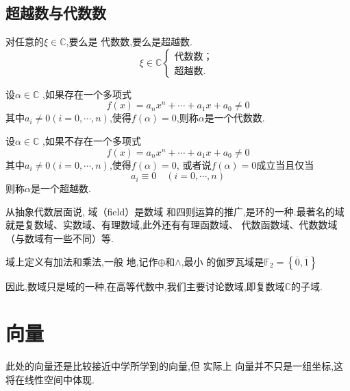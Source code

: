 \subsection{超越数与代数数}
对任意的$\xi \in \mathbb{C}$,要么是
代数数,要么是超越数.
\[
\xi \in \mathbb{C} 
\begin{cases*}
    \text{代数数；} \\
    \text{超越数.}
\end{cases*}
\]
\begin{formal}
\begin{definition}[代数数]\label{def:代数数}
    设$\alpha  \in \mathbb{C}$
    ,如果存在一个多项式
    \[
    f\left(x\right) = a_n x^n + 
    \cdots + a_1 x + a_0 \neq 0
    \]
    其中$a_i \neq 0\left(i = 0,\cdots
    ,n\right)$,使得$f\left(\alpha 
    \right) = 0$,则称$
    \alpha $是一个代数数.
\end{definition}
\end{formal}
\begin{formal}
\begin{definition}[超越数]\label{def:超越数}
    设$\alpha  \in \mathbb{C}$
    ,如果不存在一个多项式
    \[
    f\left(x\right) = a_n x^n + 
    \cdots + a_1 x + a_0 \neq 0
    \]
    其中$a_i \neq 0\left(i = 0,\cdots
    ,n\right)$,使得$f\left(\alpha 
    \right) = 0$,
    或者说$f\left(\alpha \right)= 0
    $成立当且仅当
    \[
    a_i \equiv 0\quad\left(i = 0,\cdots
    ,n\right)
    \]则称$
    \alpha $是一个超越数.
\end{definition}\end{formal}
\begin{red}
\begin{remark}
    从抽象代数层面说,
    域（\textup{field}）是数域
    和四则运算的推广,是环的一种.最著名的域就是复数域、实数域、有理数域,此外还有有理函数域、
    代数函数域、代数数域（与数域有一些不同）等.

    域上定义有加法和乘法,一般
    地,记作$\oplus$和$\wedge$,最小
    的伽罗瓦域是$\mathbb{F}_2=\left\{\overline{0},
    \overline{1}\right\}$
\end{remark}
\end{red}
\begin{red}
\begin{remark}
    因此,数域只是域的一种,在高等代数中,我们主要讨论数域,即复数域$\mathbb{C}$的子域.
\end{remark}
\end{red}
\newpage
\section{向量}
\begin{red}
\begin{remark}
    此处的向量还是比较接近中学所学到的向量,但
    实际上
    向量并不只是一组坐标,这将在线性空间中体现.
\end{remark}
\end{red}
